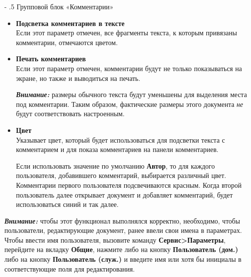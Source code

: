 ﻿\documentclass[a4paper,10pt]{article}
\makeatletter
\renewcommand\paragraph{%
   \@startsection{paragraph}{4}{0mm}%
      {-\baselineskip}%
      {.5\baselineskip}%
      {\normalfont\normalsize\bfseries}}
\makeatother
\begin{document}
\paragraph{Групповой блок «Комментарии»}
\begin{itemize}
 \item \textbf{Подсветка комментариев в тексте}\\
 Если этот параметр отмечен, все фрагменты текста, к которым привязаны комментарии, отмечаются цветом.
 \item \textbf{Печать комментариев}\\
 Если этот параметр отмечен, комментарии будут не только показываться на экране, но также и выводиться на печать.
 
 \begin{mdframed}[backgroundcolor=blue!10]
\textbf{\textit{Внимание:}} размеры обычного текста будут уменьшены для выделения места под комментарии. Таким образом, фактические размеры этого документа \textit{не} будут соответствовать настроенным.
\end{mdframed}
\item \textbf{Цвет}\\
Указывает цвет, который будет использоваться для подсветки текста с комментарием и для показа комментариев на панели комментариев.

Если использовать значение по умолчанию \textbf{Автор}, то для каждого пользователя, добавившего комментарий, выбирается различный цвет. Комментарии первого пользователя подсвечиваются красным. Когда второй пользователь далее открывает документ и добавляет комментарий, будет использоваться синий и так далее.
\end{itemize}

\begin{mdframed}[backgroundcolor=blue!10]
\textbf{\textit{Внимание:}} чтобы этот функционал выполнялся корректно, необходимо, чтобы пользователи, редактирующие документ, ранее ввели свои имена в параметрах. Чтобы ввести имя пользователя, вызовите команду \textbf{Сервис>Параметры}, перейдите на вкладку \textbf{Общие}, нажмите либо на кнопку \textbf{Пользователь (дом.)} либо на кнопку \textbf{Пользователь (служ.)} и введите имя или хотя бы инициалы в соответствующие поля для редактирования.
\end{mdframed}
\end{document}
